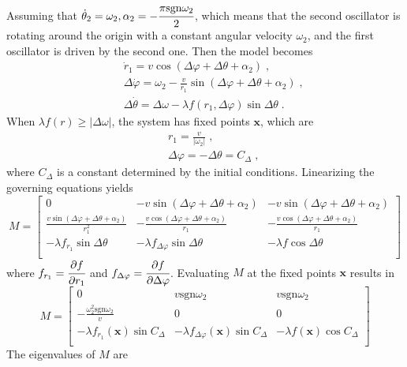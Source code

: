 \documentclass{article}
\begin{document}
Assuming that $\dot{\theta}_2=\omega _2, \alpha_2=-\cfrac{\pi\text{sgn}\omega_2}{2}$, which means that the second oscillator is rotating around the origin with a constant angular velocity $\omega_2$, and the first oscillator is driven by the second one. Then the model becomes
\begin{eqnarray}
    &&\dot{r}_1=v\cos \left( \Delta \varphi +\Delta \theta +\alpha _2 \right)\;,\\
    &&\Delta \dot{\varphi}=\omega _2-\frac{v}{r_1}\sin \left( \Delta \varphi +\Delta \theta +\alpha _2 \right)\;,\\
    &&\Delta \dot{\theta}=\Delta \omega -\lambda f\left( r_1,\Delta \varphi \right) \sin \Delta \theta\;.
\end{eqnarray}
When $\lambda f\left( r \right) \geqslant \left| \Delta \omega \right|$, the system has fixed points $\mathbf{x}$, which are
\begin{eqnarray}
    &&r_1=\frac{v}{|\omega _2|}\;,\\
	&&\Delta \varphi =-\Delta \theta =C_{\Delta}\;,
\end{eqnarray}
where $C_{\Delta}$ is a constant determined by the initial conditions. Linearizing the governing equations yields
\begin{equation}
    M=\left[ \begin{matrix}
        0&		-v\sin \left( \Delta \varphi +\Delta \theta +\alpha _2 \right)&		-v\sin \left( \Delta \varphi +\Delta \theta +\alpha _2 \right)\\
        \frac{v\sin \left( \Delta \varphi +\Delta \theta +\alpha _2 \right)}{r_{1}^{2}}&		-\frac{v\cos \left( \Delta \varphi +\Delta \theta +\alpha _2 \right)}{r_1}&		-\frac{v\cos \left( \Delta \varphi +\Delta \theta +\alpha _2 \right)}{r_1}\\
        -\lambda f_{r_1}\sin \Delta \theta&		-\lambda f_{\Delta \varphi}\sin \Delta \theta&		-\lambda f\cos \Delta \theta\\
    \end{matrix} \right]
\end{equation}
where $f_{r_1}=\cfrac{\partial f}{\partial r_1}$ and $f_{\Delta \varphi}=\cfrac{\partial f}{\partial \Delta \varphi}$. Evaluating $M$ at the fixed points $\mathbf{x}$ results in
\begin{equation}
    M=\left[ \begin{matrix}
        0&		v\text{sgn} \omega _2&		v\text{sgn} \omega _2\\
        -\frac{\omega _{2}^{2}\text{sgn} \omega _2}{v}&		0&		0\\
        -\lambda f_{r_1}\left( \mathbf{x} \right) \sin C_{\Delta}&		-\lambda f_{\Delta \varphi}\left( \mathbf{x} \right) \sin C_{\Delta}&		-\lambda f\left( \mathbf{x} \right)\cos C_{\Delta}\\
    \end{matrix} \right]
\end{equation}
The eigenvalues of $M$ are
\end{document}
